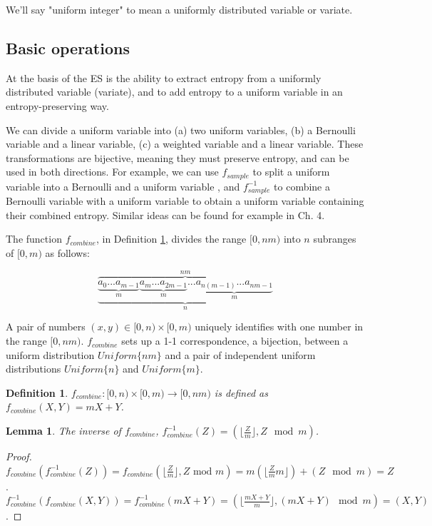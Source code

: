 \documentclass[12pt]{article}
\newtheorem{lemma}{Lemma}
\newtheorem{definition}{Definition}
\begin{document}
We'll say "uniform integer" to mean a uniformly distributed variable or variate.


\subsection{Basic operations}

At the basis of the ES is the ability to extract entropy from a uniformly distributed variable (variate), and to add entropy to a uniform variable in an entropy-preserving way.

We can divide a uniform variable into (a) two uniform variables, (b) a Bernoulli variable and a linear variable, (c) a weighted variable and a linear variable. These transformations are bijective, meaning they must preserve entropy, and can be used in both directions.  For example, we can use $f_{sample}$ to split a uniform variable into a Bernoulli and a uniform variable , and $f^{-1}_{sample}$ to combine a Bernoulli variable with a uniform variable to obtain a uniform variable containing their combined entropy. Similar ideas can be found for example in \cite{gentle2003random} Ch. 4. 

The function $f_{combine}$, in Definition \ref{def:combine}, divides the range $[0,nm)$ into $n$ subranges of $[0,m)$ as follows:

\[
\overbrace{
    \underbrace{
        \underbrace{a_0 ... a_{m-1}}_{m}
        \underbrace{a_m ... a_{2m-1}}_{m}
        ...
        \underbrace{a_{n(m-1)}...a_{nm-1}}_{m} 
        }_{n}}
        ^{nm}
\]

A pair of numbers $(x,y) \in [0,n)\times[0,m)$ uniquely identifies with one number in the range $[0,nm)$. $f_{combine}$ sets up a 1-1 correspondence, a bijection, between a uniform distribution $Uniform\{nm\}$ and a pair of independent uniform distributions $Uniform\{n\}$ and $Uniform\{m\}$.

\begin{definition}
    $f_{combine}: [0,n)\times [0,m) \rightarrow [0,nm)$ is defined as $f_{combine}(X,Y) = mX+Y$.
    \label{def:combine}
\end{definition}

\begin{lemma}
    The inverse of $f_{combine}$, $f^{-1}_{combine}(Z) = (\lfloor \frac{Z}{m} \rfloor, Z \mod m)$.
\end{lemma}

\begin{proof}
    $f_{combine}(f^{-1}_{combine}(Z)) = f_{combine}(\lfloor \frac{Z}{m}\rfloor, Z \text{ mod } m) = m(\lfloor \frac{Z}{m}m \rfloor) + (Z \mod m) = Z$. $f^{-1}_{combine}(f_{combine}(X,Y)) = f^{-1}_{combine}(mX+Y) = (\lfloor\frac{mX+Y}{m}\rfloor, (mX+Y)\mod m) = (X,Y)$.
\end{proof}
\end{document}
